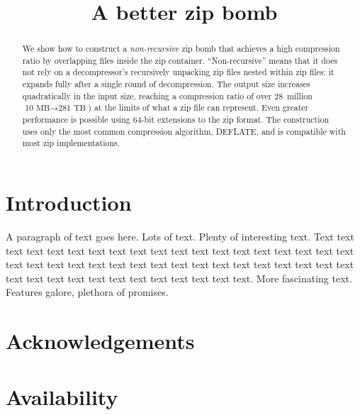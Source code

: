 \documentclass[letterpaper,twocolumn,10pt]{article}
\begin{document}
\date{}

\title{\Large \bf A better zip bomb}

\author{
}

\maketitle

\begin{abstract}
We show how to construct a
\emph{non-recursive} zip bomb
that achieves a high compression ratio by
overlapping files inside the zip container.
``Non-recursive'' means that it does not rely on
a decompressor's recursively unpacking zip files nested within zip files:
it expands fully after a single round of decompression.
The output size increases quadratically in the input size,
reaching a compression ratio of over 28~million
$\mbox{10~MB} \rightarrow \mbox{281~TB}$)
at the limits of what a zip file can represent.
Even greater performance is possible using
64-bit extensions to the zip format.
The construction uses only the most common compression algorithm, DEFLATE,
and is compatible with most zip implementations.
\end{abstract}


\section{Introduction}

A paragraph of text goes here. Lots of text. Plenty of interesting
text. Text text text text text text text text text text text text text
text text text text text text text text text text text text text text
text text text text text text text text text text text text text text
text text text text text text text.
More fascinating text. Features galore, plethora of promises.

\cite{190996}

\section*{Acknowledgements}

\section*{Availability}




\end{document}
